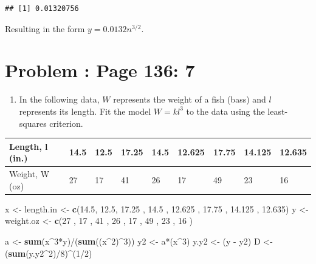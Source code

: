 \documentclass[]{article}
\newenvironment{Shaded}{\begin{snugshade}}{\end{snugshade}}
\newcommand{\KeywordTok}[1]{\textcolor[rgb]{0.13,0.29,0.53}{\textbf{{#1}}}}
\newcommand{\DecValTok}[1]{\textcolor[rgb]{0.00,0.00,0.81}{{#1}}}
\newcommand{\FloatTok}[1]{\textcolor[rgb]{0.00,0.00,0.81}{{#1}}}
\newcommand{\StringTok}[1]{\textcolor[rgb]{0.31,0.60,0.02}{{#1}}}
\newcommand{\NormalTok}[1]{{#1}}
\providecommand{\tightlist}{%
  \setlength{\itemsep}{0pt}\setlength{\parskip}{0pt}}
\begin{document}
\begin{verbatim}
## [1] 0.01320756
\end{verbatim}

Resulting in the form \(y = 0.0132n^{3/2}\).

\section{Problem : Page 136: 7}\label{problem-page-136-7}

\begin{enumerate}
\def\labelenumi{\alph{enumi}.}
\tightlist
\item
  In the following data, \(W\) represents the weight of a fish (bass)
  and \(l\) represents its length. Fit the model \(W = kl^3\) to the
  data using the least-squares criterion.
\end{enumerate}

\begin{table}[!htbp]
\centering
\label{my-label}
\begin{tabular}{l|llllllll}
Length, l (in.) & 14.5 & 12.5 & 17.25 & 14.5 & 12.625 & 17.75 & 14.125 & 12.635 \\ \hline
Weight, W (oz)  & 27   & 17   & 41    & 26   & 17     & 49    & 23     & 16  
\end{tabular}
\end{table}

\begin{Shaded}
\begin{Highlighting}[]
\NormalTok{x <-}\StringTok{ }\NormalTok{length.in <-}\StringTok{ }\KeywordTok{c}\NormalTok{(}\FloatTok{14.5}\NormalTok{, }\FloatTok{12.5}\NormalTok{, }\FloatTok{17.25} \NormalTok{, }\FloatTok{14.5} \NormalTok{, }\FloatTok{12.625} \NormalTok{, }\FloatTok{17.75} \NormalTok{, }\FloatTok{14.125} \NormalTok{, }\FloatTok{12.635}\NormalTok{)}
\NormalTok{y <-}\StringTok{ }\NormalTok{weight.oz <-}\StringTok{ }\KeywordTok{c}\NormalTok{(}\DecValTok{27} \NormalTok{, }\DecValTok{17}   \NormalTok{, }\DecValTok{41}    \NormalTok{, }\DecValTok{26}   \NormalTok{, }\DecValTok{17}     \NormalTok{, }\DecValTok{49}    \NormalTok{, }\DecValTok{23}     \NormalTok{, }\DecValTok{16} \NormalTok{)}

\NormalTok{a <-}\StringTok{ }\KeywordTok{sum}\NormalTok{(x^}\DecValTok{3}\NormalTok{*y)/(}\KeywordTok{sum}\NormalTok{((x^}\DecValTok{2}\NormalTok{)^}\DecValTok{3}\NormalTok{))}
\NormalTok{y2 <-}\StringTok{ }\NormalTok{a*(x^}\DecValTok{3}\NormalTok{)}
\NormalTok{y.y2 <-}\StringTok{ }\NormalTok{(y -}\StringTok{ }\NormalTok{y2)}
\NormalTok{D <-}\StringTok{ }\NormalTok{(}\KeywordTok{sum}\NormalTok{(y.y2^}\DecValTok{2}\NormalTok{)/}\DecValTok{8}\NormalTok{)^(}\DecValTok{1}\NormalTok{/}\DecValTok{2}\NormalTok{)}
\end{Highlighting}
\end{Shaded}
\end{document}
